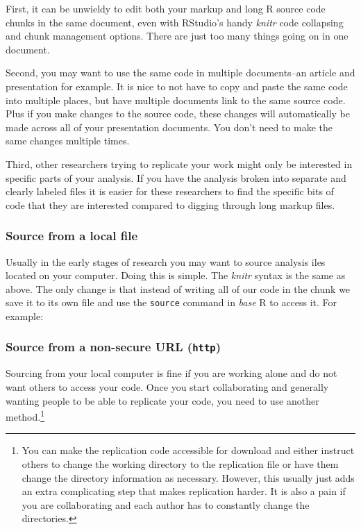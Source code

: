 \documentclass[ChapterTOCs,krantz1]{krantz}\usepackage{graphicx, color}
\begin{document}
{{First, it can be unwieldy to edit both your markup and long R source code chunks in the same document, even with RStudio's handy {\emph{knitr}} code collapsing and chunk management options. There are just too many things going on in one document.

Second, you may want to use the same code in multiple documents--an article and presentation for example. It is nice to not have to copy and paste the same code into multiple places, but have multiple documents link to the same source code. Plus if you make changes to the source code, these changes will automatically be made across all of your presentation documents. You don't need to make the same changes multiple times.

Third, other researchers trying to replicate your work might only be interested in specific parts of your analysis. If you have the analysis broken into separate and clearly labeled files it is easier for these
researchers to find the specific bits of code that they are interested compared to digging through long markup files.

\subsubsection{Source from a local file}

Usually in the early stages of research you may want to source analysis iles located on your computer. Doing this is simple. The {\emph{knitr}} syntax is the same as above. The only change is that instead of writing all of our code in the chunk we save it to its own file and use the \texttt{source} command in \emph{base} R to access it. For example:

\subsubsection{Source from a non-secure URL (\texttt{http})}

Sourcing from your local computer is fine if you are working alone and do not want others to access your code. Once you start collaborating and generally wanting people to be able to replicate your code, you need to
use another method.\footnote{You can make the replication code accessible for download and either instruct others to change the working directory to the replication file or have them change the directory information as necessary. However, this usually just adds an extra complicating step that makes replication harder. It is also a   pain if you are collaborating and each author has to constantly change the directories.}

}}
\end{document}
